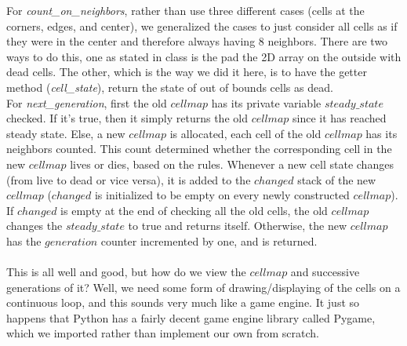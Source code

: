 \documentclass[12pt]{report}
\begin{document}
For \emph{count\_on\_neighbors}, rather than use three different cases (cells at the corners, edges, and center), we generalized
the cases to just consider all cells as if they were in the center and therefore always having 8 neighbors. 
There are two ways to do this, one as stated in class is the pad the 2D array on the outside with dead cells.
The other, which is the way we did it here, is to have the getter method (\emph{cell\_state}), return the state of 
out of bounds cells as dead.\\

For \emph{next\_generation}, first the old $cellmap$ has its private variable $steady\_state$ checked.
If it's true, then it simply returns the old $cellmap$ since it has reached steady state.
Else, a new $cellmap$ is allocated, each cell of the old $cellmap$ has its neighbors counted.
This count determined whether the corresponding cell in the new $cellmap$ lives or dies, based on the rules. 
Whenever a new cell state changes (from live to dead or vice versa), it is added to the $changed$ stack of the new $cellmap$ 
($changed$ is initialized to be empty on every newly constructed $cellmap$).
If $changed$ is empty at the end of checking all the old cells, the old $cellmap$ changes the $steady\_state$ to true and returns
itself. Otherwise, the new $cellmap$ has the $generation$ counter incremented by one, and is returned.\\\\
This is all well and good, but how do we view the $cellmap$ and successive generations of it?
Well, we need some form of drawing/displaying of the cells on a continuous loop, and this sounds very much like a game engine.
It just so happens that Python has a fairly decent game engine library called Pygame, which we imported rather than implement our own from scratch.\cite{pygame}
\end{document}
